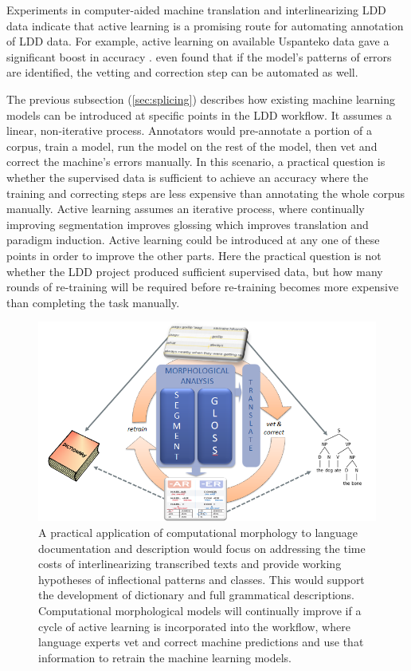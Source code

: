 \documentclass[12pt]{article}
\begin{document}
Experiments in computer-aided machine translation \cite{kothur_document-level_2018} and interlinearizing LDD data \cite{palmer_semi-automated_2009,palmer_evaluating_2009,palmer_computational_2010} indicate that active learning is a promising route for automating annotation of LDD data. For example, active learning on available Uspanteko data gave a significant boost in accuracy \cite{palmer_semi-automated_2009}.  even found that if the model's patterns of errors are identified, the vetting and correction step can be automated as well. 

The previous subsection (\ref{sec:splicing}) describes how existing machine learning models can be introduced at specific points in the LDD workflow. It assumes a linear, non-iterative process. Annotators would pre-annotate a portion of a corpus, train a model, run the model on the rest of the model, then vet and correct the machine's errors manually. In this scenario, a practical question is whether the supervised data is sufficient to achieve an accuracy where the training and correcting steps are less expensive than annotating the whole corpus manually. Active learning assumes an iterative process, where continually improving segmentation improves glossing which improves translation and paradigm induction. Active learning could be introduced at any one of these points in order to improve the other parts. Here the practical question is not whether the LDD project produced sufficient supervised data, but how many rounds of re-training will be required before re-training becomes more expensive than completing the task manually. 

\begin{figure}[ht]
\label{fig:ML-LDD}
\begin{center}
\includegraphics[width=0.75\columnwidth]{ML-LDD.PNG}
\caption{A practical application of computational morphology to language documentation and description would focus on addressing the time costs of interlinearizing transcribed texts and provide working hypotheses of inflectional patterns and classes. This would support the development of dictionary and full grammatical descriptions. Computational morphological models will continually improve if a cycle of active learning is incorporated into the workflow, where language experts vet and correct machine predictions and use that information to retrain the machine learning models.}
\end{center}
\end{figure}
\end{document}

